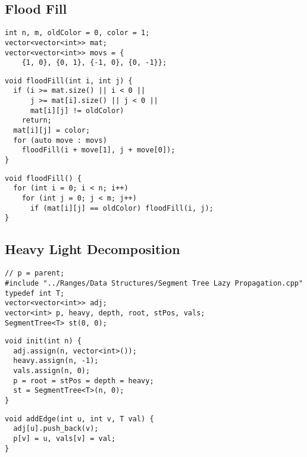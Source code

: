 \documentclass[twoside]{article}
\newcommand{\fileTitleStyle}{\large\underline}
\begin{document}
\begin{multicols*}{2}
\subsectionfont{\centering\bfseries\LARGE}
\subsectionfont{\fileTitleStyle}
\subsection*{Flood Fill}
\begin{verbatim}
int n, m, oldColor = 0, color = 1;
vector<vector<int>> mat;
vector<vector<int>> movs = {
    {1, 0}, {0, 1}, {-1, 0}, {0, -1}};
\end{verbatim}
\vspace{-12pt}
\begin{verbatim}
void floodFill(int i, int j) {
  if (i >= mat.size() || i < 0 ||
      j >= mat[i].size() || j < 0 ||
      mat[i][j] != oldColor)
    return;
  mat[i][j] = color;
  for (auto move : movs)
    floodFill(i + move[1], j + move[0]);
}
\end{verbatim}
\vspace{-12pt}
\begin{verbatim}
void floodFill() {
  for (int i = 0; i < n; i++)
    for (int j = 0; j < m; j++)
      if (mat[i][j] == oldColor) floodFill(i, j);
}
\end{verbatim}

\subsectionfont{\centering\bfseries\LARGE}
\subsectionfont{\fileTitleStyle}
\subsection*{Heavy Light Decomposition}
\begin{verbatim}
// p = parent;
#include "../Ranges/Data Structures/Segment Tree Lazy Propagation.cpp"
typedef int T;
vector<vector<int>> adj;
vector<int> p, heavy, depth, root, stPos, vals;
SegmentTree<T> st(0, 0);
\end{verbatim}
\vspace{-12pt}
\begin{verbatim}
void init(int n) {
  adj.assign(n, vector<int>());
  heavy.assign(n, -1);
  vals.assign(n, 0);
  p = root = stPos = depth = heavy;
  st = SegmentTree<T>(n, 0);
}
\end{verbatim}
\vspace{-12pt}
\begin{verbatim}
void addEdge(int u, int v, T val) {
  adj[u].push_back(v);
  p[v] = u, vals[v] = val;
}


\end{verbatim}
\end{multicols*}
\end{document}
